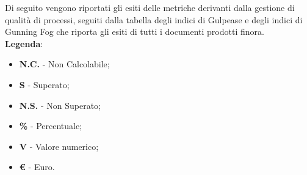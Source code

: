 		Di seguito vengono riportati gli esiti delle metriche derivanti dalla gestione di qualità di processi, seguiti dalla tabella degli indici di Gulpease e degli indici di Gunning Fog che riporta gli esiti di tutti i documenti prodotti finora. \\
\textbf{Legenda}:
\begin{itemize}
	\item \textbf{N.C.} - Non Calcolabile;
	\item \textbf{S} - Superato;
	\item \textbf{N.S.} - Non Superato;
	\item \textbf{\%} - Percentuale;
	\item \textbf{V} - Valore numerico;
	\item \textbf{\euro{}} - Euro.
\end{itemize}
